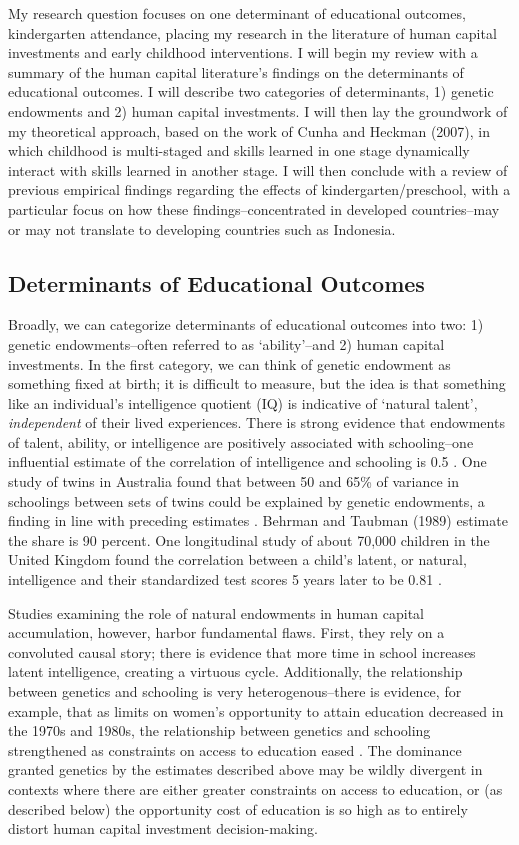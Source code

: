 My research question focuses on one determinant of educational outcomes, kindergarten attendance, placing my research in the literature of human capital investments and early childhood interventions. I will begin my review with a summary of the human capital literature's findings on the determinants of educational outcomes. I will describe two categories of determinants, 1) genetic endowments and 2) human capital investments. I will then lay the groundwork of my theoretical approach, based on the work of Cunha and Heckman (2007), in which childhood is multi-staged and skills learned in one stage dynamically interact with skills learned in another stage. I will then conclude with a review of previous empirical findings regarding the effects of kindergarten/preschool, with a particular focus on how these findings--concentrated in developed countries--may or may not translate to developing countries such as Indonesia.

\subsection{Determinants of Educational Outcomes}
Broadly, we can categorize determinants of educational outcomes into two: 1) genetic endowments--often referred to as `ability'--and 2) human capital investments. In the first category, we can think of genetic endowment as something fixed at birth; it is difficult to measure, but the idea is that something like an individual's intelligence quotient (IQ) is indicative of `natural talent', \textit{independent} of their lived experiences. There is strong evidence that endowments of talent, ability, or intelligence are positively associated with schooling--one influential estimate of the correlation of intelligence and schooling is 0.5 \citep{Johnson2005}. One study of twins in Australia found that between 50 and 65\% of variance in schoolings between sets of twins could be explained by genetic endowments, a finding in line with preceding estimates \citep{Miller2001}. Behrman and Taubman (1989) estimate the share is 90 percent. One longitudinal study of about 70,000 children in the United Kingdom found the correlation between a child's latent, or natural, intelligence and their standardized test scores 5 years later to be 0.81 \citep{Deary2007}.

Studies examining the role of natural endowments in human capital accumulation, however, harbor fundamental flaws. First, they rely on a convoluted causal story; there is evidence that more time in school increases latent intelligence, creating a virtuous cycle. Additionally, the relationship between genetics and schooling is very heterogenous--there is evidence, for example, that as limits on women's opportunity to attain education decreased in the 1970s and 1980s, the relationship between genetics and schooling strengthened as constraints on access to education eased \citep{Herd2019}. The dominance granted genetics by the estimates described above may be wildly divergent in contexts where there are either greater constraints on access to education, or (as described below) the opportunity cost of education is so high as to entirely distort human capital investment decision-making.

